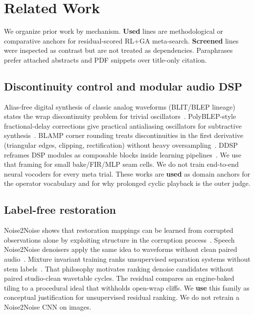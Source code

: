 \section{Related Work}
\label{sec:related_work}

We organize prior work by mechanism.
\textbf{Used} lines are methodological or comparative anchors for residual-scored RL+GA meta-search.
\textbf{Screened} lines were inspected as contrast but are not treated as dependencies.
Paraphrases prefer attached abstracts and PDF snippets over title-only citation.

\subsection{Discontinuity control and modular audio DSP}
Alias-free digital synthesis of classic analog waveforms (BLIT/BLEP lineage) states the wrap discontinuity problem for trivial oscillators~\cite{stilson1996}.
PolyBLEP-style fractional-delay corrections give practical antialiasing oscillators for subtractive synthesis~\cite{nam2009polyblep}.
BLAMP corner rounding treats discontinuities in the first derivative (triangular edges, clipping, rectification) without heavy oversampling~\cite{esqueda2016blamp}.
DDSP reframes DSP modules as composable blocks inside learning pipelines~\cite{engel2020}.
We use that framing for small bake/FIR/MLP seam cells.
We do not train end-to-end neural vocoders for every meta trial.
These works are \textbf{used} as domain anchors for the operator vocabulary and for why prolonged cyclic playback is the outer judge.

\subsection{Label-free restoration}
Noise2Noise shows that restoration mappings can be learned from corrupted observations alone by exploiting structure in the corruption process~\cite{lehtinen2018}.
Speech Noise2Noise denoisers apply the same idea to waveforms without clean paired audio~\cite{kashyap2021n2n}.
Mixture invariant training ranks unsupervised separation systems without stem labels~\cite{wisdom2020}.
That philosophy motivates ranking denoise candidates without paired studio-clean wavetable cycles.
The residual compares an engine-baked tiling to a procedural ideal that withholds open-wrap cliffs.
We \textbf{use} this family as conceptual justification for unsupervised residual ranking.
We do not retrain a Noise2Noise CNN on images.

